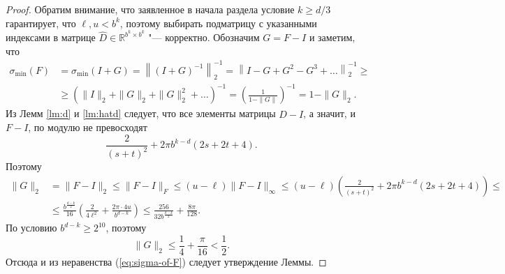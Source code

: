 \documentclass[3p]{cmmp}%
\numberwithin{equation}{section}
\begin{document}
\begin{proof}
	Обратим внимание, что заявленное в начала раздела условие $k \geq d/3$ гарантирует, что $\ell, u < b^k$, поэтому выбирать подматрицу с указанными индексами в матрице $\widehat{D} \in \mathbb{R}^{b^k \times b^k}$ "--- корректно.
	Обозначим $G = F - I$ и заметим, что
	\begin{align} \label{eq:sigma-of-F}
	\sigma_{\min}(F) 
	&=
	\sigma_{\min}(I + G)
	=
	\left\| (I+G)^{-1}\right\|_2^{-1}
	=
	\left\| I-G+G^2-G^3+\dots\right\|_2^{-1}
	\geq \nonumber \\ &\ge
	\left(\| I\|_2 + \| G\|_2+\| G\|_2^2+\dots\right)^{-1}
	=
	\left( \frac{1}{1-\| G \|}\right) ^{-1}
	=
	1 - \| G\|_2.
	\end{align}
	Из Лемм \ref{lm:d} и \ref{lm:hatd} следует, что все элементы матрицы $\widehat{D} - I$,
	а значит, и $F - I$, по модулю не превосходят
	\[
	\frac{2}{(s+t)^2} + 2\pi b^{k-d}(2s + 2t + 4).
	\]
	Поэтому
	\begin{align*}
	\|G\|_2
	&= \| F - I \|_2
	\le
	\| F - I \|_F
	\le
	(u-\ell) \|F-I\|_\infty \le (u-\ell)\left(\frac{2}{(s+t)^2} + 2\pi b^{k-d}(2s + 2t + 4)\right)
	\leq \\ &\le
	\frac{b^{\frac{d-k}{2}}}{16}\left(\frac{2}{4\ell^2} + \frac{2\pi\cdot 4u}{b^{d-k}}\right)
	\le 
	\frac{256}{32b^{\frac{d-k}{2}}} + \frac{8\pi}{128}.
	\end{align*}
	По условию $b^{d-k} \geq 2^{10}$, поэтому 
	\[
	\|G\|_2 \leq \frac{1}{4} + \frac{\pi}{16} < \frac{1}{2}.
	\]
	Отсюда и из неравенства (\ref{eq:sigma-of-F}) следует утверждение Леммы.
\end{proof}
\end{document}
